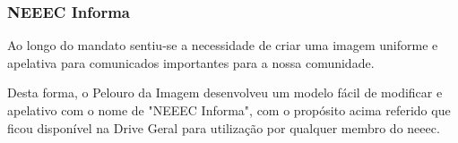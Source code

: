 
\subsubsection{NEEEC Informa}

Ao longo do mandato sentiu-se a necessidade de criar uma imagem uniforme e apelativa para comunicados importantes para a nossa comunidade.

Desta forma, o Pelouro da Imagem desenvolveu um modelo fácil de modificar e apelativo com o nome de "NEEEC Informa", com o propósito acima referido que ficou disponível na Drive Geral para utilização por qualquer membro do \acrshort{neeec}.